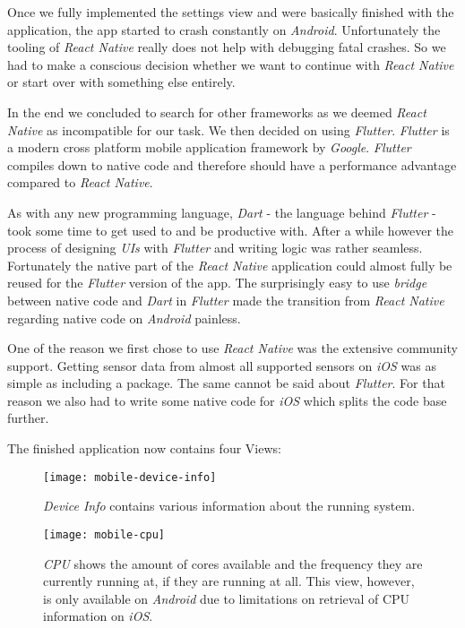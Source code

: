 Once we fully implemented the settings view and were basically finished with the application, the
app started to crash constantly on \textit{Android}. Unfortunately the tooling of \textit{React
Native} really does not help with debugging fatal crashes. So we had to make a conscious decision
whether we want to continue with \textit{React Native} or start over with something else entirely.

In the end we concluded to search for other frameworks as we deemed \textit{React Native} as
incompatible for our task. We then decided on using \textit{Flutter}. \textit{Flutter} is a modern
cross platform mobile application framework by \textit{Google}. \textit{Flutter} compiles down to
native code and therefore should have a performance advantage compared to \textit{React Native}.

As with any new programming language, \textit{Dart} - the language behind \textit{Flutter} - took
some time to get used to and be productive with. After a while however the process of designing
\textit{UIs} with \textit{Flutter} and writing logic was rather seamless. Fortunately the native
part of the \textit{React Native} application could almost fully be reused for the \textit{Flutter}
version of the app. The surprisingly easy to use \textit{bridge} between native code and
\textit{Dart} in \textit{Flutter} made the transition from \textit{React Native} regarding native
code on \textit{Android} painless.

One of the reason we first chose to use \textit{React Native} was the extensive community support.
Getting sensor data from almost all supported sensors on \textit{iOS} was as simple as including a
package. The same cannot be said about \textit{Flutter}. For that reason we also had to write some
native code for \textit{iOS} which splits the code base further.

The finished application now contains four Views:

\begin{figure}[H]
  \centering
  \texttt{[image: mobile-device-info]}
  \caption{\textit{Device Info} contains various information about the running system.}
\end{figure}


\begin{figure}[H]
  \centering
  \texttt{[image: mobile-cpu]}
  \caption{\textit{CPU} shows the amount of cores available and the frequency they are currently
  running at, if they are running at all. This view, however, is only available on \textit{Android}
  due to limitations on retrieval of CPU information on \textit{iOS}.}
\end{figure}


